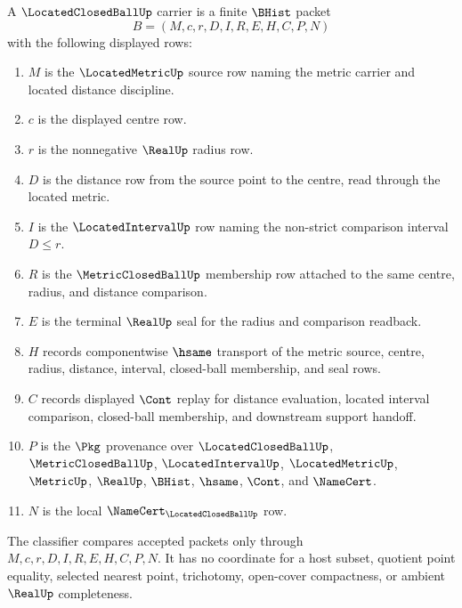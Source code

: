 \begin{definition}
\label{def:located-closed-ball-carrier}
A $\LocatedClosedBallUp$ carrier is a finite $\BHist$ packet
$$
B=(M,c,r,D,I,R,E,H,C,P,N)
$$
with the following displayed rows:
\begin{enumerate}
\item $M$ is the $\LocatedMetricUp$ source row naming the metric carrier and located distance discipline.
\item $c$ is the displayed centre row.
\item $r$ is the nonnegative $\RealUp$ radius row.
\item $D$ is the distance row from the source point to the centre, read through the located metric.
\item $I$ is the $\LocatedIntervalUp$ row naming the non-strict comparison interval $D\leq r$.
\item $R$ is the $\MetricClosedBallUp$ membership row attached to the same centre, radius, and distance comparison.
\item $E$ is the terminal $\RealUp$ seal for the radius and comparison readback.
\item $H$ records componentwise $\hsame$ transport of the metric source, centre, radius, distance, interval, closed-ball membership, and seal rows.
\item $C$ records displayed $\Cont$ replay for distance evaluation, located interval comparison, closed-ball membership, and downstream support handoff.
\item $P$ is the $\Pkg$ provenance over $\LocatedClosedBallUp$, $\MetricClosedBallUp$, $\LocatedIntervalUp$, $\LocatedMetricUp$, $\MetricUp$, $\RealUp$, $\BHist$, $\hsame$, $\Cont$, and $\NameCert$.
\item $N$ is the local $\NameCert_{\LocatedClosedBallUp}$ row.
\end{enumerate}
The classifier compares accepted packets only through $M,c,r,D,I,R,E,H,C,P,N$. It has no coordinate for a host subset, quotient point equality, selected nearest point, trichotomy, open-cover compactness, or ambient $\RealUp$ completeness.
\end{definition}

